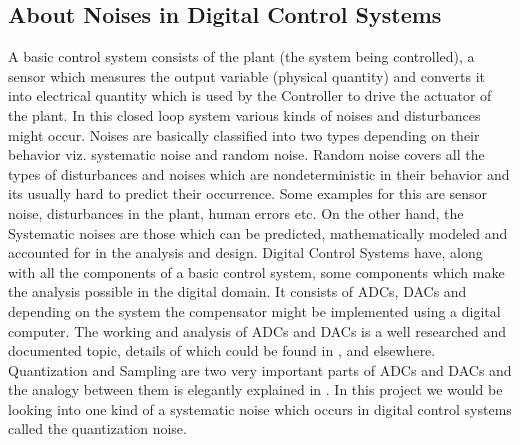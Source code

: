 \documentclass[colorlinks=true,pdfstartview=FitV,linkcolor=blue,
            citecolor=red,urlcolor=magenta]{ligodoc}
\begin{document}
\subsection{About Noises in Digital Control Systems} A basic control system consists of the plant (the system being controlled), a sensor which measures the output variable (physical quantity) and converts it into electrical quantity which is used by the Controller to drive the actuator of the plant. In this closed loop system various kinds of noises and disturbances might occur. Noises are basically classified into two types depending on their behavior viz. systematic noise and random noise. Random noise covers all the types of disturbances and noises which are nondeterministic in their behavior and its usually hard to predict their occurrence. Some examples for this are sensor noise, disturbances in the plant, human errors etc. On the other hand, the Systematic noises are those which can be predicted, mathematically modeled  and accounted for in the analysis and design.
Digital Control Systems have, along with all the components of a basic control system, some components which make the analysis possible in the digital domain. It consists of ADCs, DACs and depending on the system the compensator might be implemented using a digital computer. The working and analysis of ADCs and DACs is a well researched and documented topic, details of which could be found in \cite{Tretter}, \cite{Sheingold} and elsewhere. Quantization and Sampling are two very important parts of ADCs and DACs and the analogy between them is elegantly explained in \cite{Kollar}. In this project we would be looking into one kind of a systematic noise which occurs in digital control systems called the quantization noise.
\end{document}
